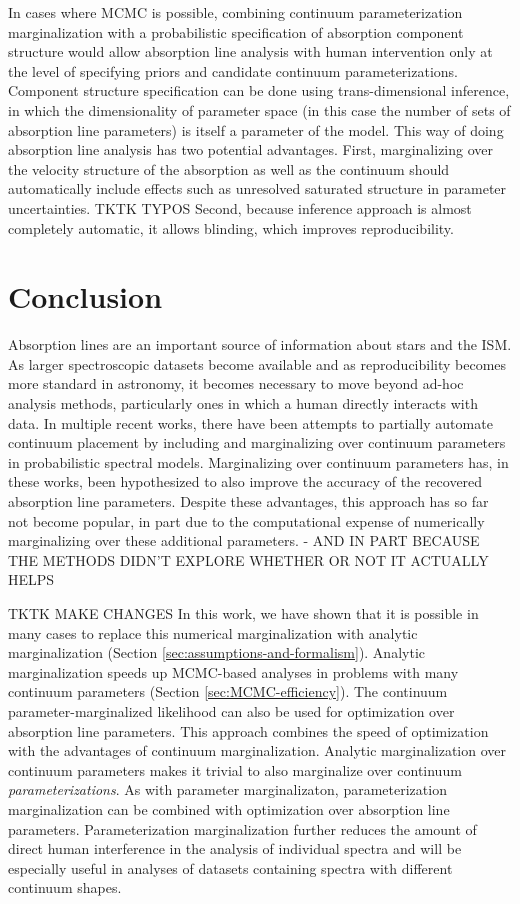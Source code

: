 \documentclass[trackchanges]{aastex62}
\begin{document}
In cases where MCMC is possible, combining continuum parameterization marginalization with a probabilistic specification of absorption component structure would allow absorption line analysis with human intervention only at the level of specifying priors and candidate continuum parameterizations.
Component structure specification can be done using trans-dimensional inference, in which the dimensionality of parameter space (in this case the number of sets of absorption line parameters) is itself a parameter of the model.
This way of doing absorption line analysis has two potential advantages.
First, marginalizing over the velocity structure of the absorption as well as the continuum should automatically include effects such as unresolved saturated structure in parameter uncertainties.
TKTK TYPOS
Second, because inference approach is almost completely automatic, it allows blinding, which improves reproducibility.

\section{Conclusion}
\label{sec:conclusion}
Absorption lines are an important source of information about stars and the ISM.
As larger spectroscopic datasets become available and as reproducibility becomes more standard in astronomy, it becomes necessary to move beyond ad-hoc analysis methods, particularly ones in which a human directly interacts with data.
In multiple recent works, there have been attempts to partially automate continuum placement by including and marginalizing over continuum parameters in probabilistic spectral models.
Marginalizing over continuum parameters has, in these works, been hypothesized to also improve the accuracy of the recovered absorption line parameters.
Despite these advantages, this approach has so far not become popular, in part due to the computational expense of numerically marginalizing over these additional parameters.
- AND IN PART BECAUSE THE METHODS DIDN'T EXPLORE WHETHER OR NOT IT ACTUALLY HELPS

TKTK MAKE CHANGES
In this work, we have shown that it is possible in many cases to replace this numerical marginalization with analytic marginalization (Section \ref{sec:assumptions-and-formalism}).
Analytic marginalization speeds up MCMC-based analyses in problems with many continuum parameters (Section \ref{sec:MCMC-efficiency}).
The continuum parameter-marginalized likelihood can also be used for optimization over absorption line parameters.
This approach combines the speed of optimization with the advantages of continuum marginalization.
Analytic marginalization over continuum parameters makes it trivial to also marginalize over continuum \emph{parameterizations}.
As with parameter marginalizaton, parameterization marginalization can be combined with optimization over absorption line parameters.
Parameterization marginalization further reduces the amount of direct human interference in the analysis of individual spectra and will be especially useful in analyses of datasets containing spectra with different continuum shapes.
\end{document}
